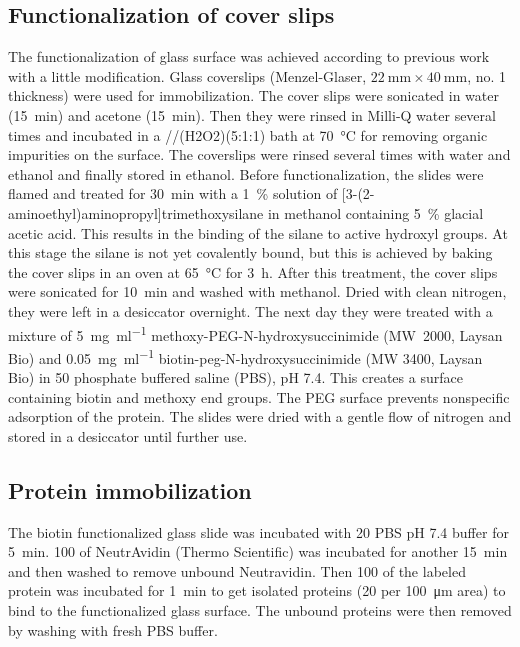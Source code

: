 \documentclass[journal=jacsat,manuscript=article]{achemso}
\begin{document}
\subsection{Functionalization of cover slips}
The functionalization of glass surface was achieved according to previous work with a little modification.\cite{gupta2012involvement}
Glass coverslips (Menzel-Glaser, $\SI{22}{\mm} \times \SI{40}{\mm}$, no. 1 thickness) were used for immobilization.
The cover slips were sonicated in water (\SI{15}{\minute}) and acetone (\SI{15}{\minute}).
Then they were rinsed in Milli-Q water several times and incubated in a //\ce(H2O2)(5:1:1) bath at \SI{70}{\celsius} for removing organic impurities on the surface.
The coverslips were rinsed several times with water and ethanol and finally stored in ethanol.
Before functionalization, the slides were flamed and treated for \SI{30}{\minute} with a \SI{1}{\percent} solution of [3-(2-aminoethyl)aminopropyl]trimethoxysilane in methanol containing \SI{5}{\percent} glacial acetic acid. This results in the binding of the silane to active hydroxyl groups.
At this stage the silane is not yet covalently bound, but this is achieved by baking the cover slips in an oven at \SI{65}{\celsius} for \SI{3}{\hour}.
After this treatment, the cover slips were sonicated for \SI{10}{\minute} and washed with methanol.
Dried with clean nitrogen, they were left in a desiccator overnight. 
The next day they were treated with a mixture of \SI{5}{\mg\per\ml} methoxy-PEG-N-hydroxysuccinimide (MW~2000, Laysan Bio) and \SI{0.05}{\mg\per\ml} biotin-peg-N-hydroxysuccinimide (MW 3400, Laysan Bio) in \SI{50}{\mM} phosphate buffered saline (PBS), pH 7.4.
This creates a surface containing biotin and methoxy end groups.
The PEG surface prevents nonspecific adsorption of the protein.
The slides were dried with a gentle flow of nitrogen and stored in a desiccator until further use.

\subsection{Protein immobilization}
The biotin functionalized glass slide was incubated with \SI{20}{\mM} PBS pH 7.4 buffer for \SI{5}{\minute}.
\SI{100}{\nM} of NeutrAvidin (Thermo Scientific) was incubated for another \SI{15}{\minute} and then washed to remove unbound Neutravidin. 
Then \SI{100}{\pM} of the labeled protein was incubated for \SI{1}{\minute} to get isolated proteins (20 per \SI{100}{\um} area) to bind to the functionalized glass surface.
The unbound proteins were then removed by washing with fresh PBS buffer.
\end{document}
